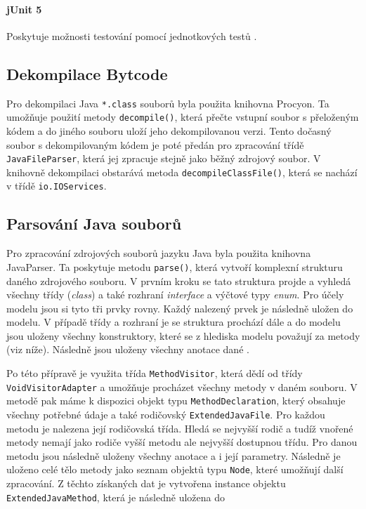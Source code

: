 			\paragraph{jUnit 5}
				Poskytuje možnosti testování pomocí jednotkových testů \cite{junit}.    	 
		
		
		\subsection{Dekompilace Bytcode}
			Pro dekompilaci Java \texttt{*.class} souborů byla použita knihovna Procyon. Ta umožňuje použití metody \texttt{decompile()}, která přečte vstupní soubor s přeloženým kódem a do jiného souboru uloží jeho dekompilovanou verzi. Tento dočasný soubor s dekompilovaným kódem je poté předán pro zpracování třídě \texttt{JavaFileParser}, která jej zpracuje stejně jako běžný zdrojový soubor. V knihovně dekompilaci obstarává metoda \texttt{decompileClassFile()}, která se nachází v třídě \texttt{io.IOServices}.
					
		    	 
	    \subsection{Parsování Java souborů}	    
			Pro zpracování zdrojových souborů jazyku Java byla použita knihovna JavaParser. Ta poskytuje metodu \texttt{parse()}, která vytvoří komplexní strukturu daného zdrojového souboru. V prvním kroku se tato struktura projde a vyhledá všechny třídy (\emph{class}) a také rozhraní \emph{interface} a výčtové typy \emph{enum}. Pro účely modelu jsou si tyto tři prvky rovny. Každý nalezený prvek je následně uložen do modelu. V případě třídy a rozhraní je se struktura prochází dále a do modelu jsou uloženy všechny konstruktory, které se z hlediska modelu považují za metody (viz níže). Následně jsou uloženy všechny anotace dané .
			
			Po této přípravě je využita třída \texttt{MethodVisitor}, která dědí od třídy \texttt{VoidVisitorAdapter} a umožňuje procházet všechny metody v daném souboru. V metodě pak máme k dispozici objekt typu \texttt{MethodDeclaration}, který obsahuje všechny potřebné údaje a také rodičovský \texttt{ExtendedJavaFile}. Pro každou metodu je nalezena její rodičovská třída. Hledá se nejvyšší rodič a tudíž vnořené metody nemají jako rodiče vyšší metodu ale nejvyšší dostupnou třídu. Pro danou metodu jsou následně uloženy všechny anotace a i její parametry. Následně je uloženo celé tělo metody jako seznam objektů typu \texttt{Node}, které umožňují další zpracování. Z těchto získaných dat je vytvořena instance objektu \texttt{ExtendedJavaMethod}, která je následně uložena do 
		
